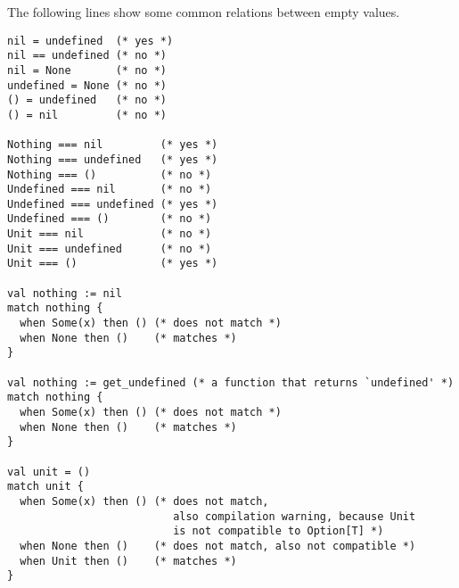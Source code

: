 The following lines show some common relations between empty values. 
\begin{lstlisting}[deletekeywords={also}]
nil = undefined  (* yes *)
nil == undefined (* no *)
nil = None       (* no *)
undefined = None (* no *)
() = undefined   (* no *)
() = nil         (* no *)

Nothing === nil         (* yes *)
Nothing === undefined   (* yes *)
Nothing === ()          (* no *)
Undefined === nil       (* no *)
Undefined === undefined (* yes *)
Undefined === ()        (* no *)
Unit === nil            (* no *)
Unit === undefined      (* no *)
Unit === ()             (* yes *)

val nothing := nil
match nothing {
  when Some(x) then () (* does not match *)
  when None then ()    (* matches *)
}

val nothing := get_undefined (* a function that returns `undefined' *)
match nothing {
  when Some(x) then () (* does not match *)
  when None then ()    (* matches *)
}

val unit = ()
match unit {
  when Some(x) then () (* does not match, 
                          also compilation warning, because Unit 
                          is not compatible to Option[T] *)
  when None then ()    (* does not match, also not compatible *)
  when Unit then ()    (* matches *)
}
\end{lstlisting}







